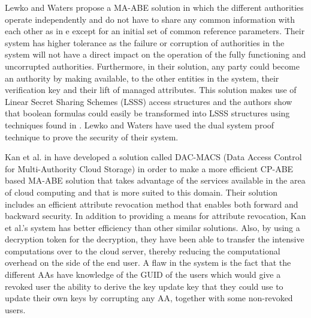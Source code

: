 Lewko and Waters propose a MA-ABE\cite{Lewko2011a}\cite{Lewko2011b} solution in which the different authorities operate independently and do not have to share any common information with each other as in \cite{Chase2007} e except for an initial set of common reference parameters. Their system has higher tolerance as the failure or corruption of authorities in the system will not have a direct impact on the operation of the fully functioning and uncorrupted authorities. Furthermore, in their solution, any party could become an authority by making available, to the other entities in the system, their verification key and their lift of managed attributes. This solution makes use of Linear Secret Sharing Schemes (LSSS) access structures and the authors show that boolean formulas could easily be transformed into LSSS structures using techniques found in \cite{Lewko2011b}. Lewko and Waters have used the dual system proof technique to prove the security of their system.

Kan et al. in \cite{Yang2013} have developed a solution called DAC-MACS (Data Access Control for Multi-Authority Cloud Storage) in order to make a more efficient CP-ABE based MA-ABE solution that takes advantage of the services available in the area of cloud computing and that is more suited to this domain. Their solution includes an efficient attribute revocation method that enables both forward and backward security. In addition to providing a means for attribute revocation, Kan et al.'s system\cite{Yang2013} has better efficiency than other similar solutions. Also, by using a decryption token for the decryption, they have been able to transfer the intensive computations over to the cloud server, thereby reducing the computational overhead on the side of the end user. A flaw in the system is the fact that the different AAs have knowledge of the GUID of the users which would give a revoked user the ability to derive the key update key that they could use to update their own keys by corrupting any AA, together with some non-revoked users.



